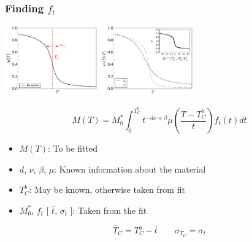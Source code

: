 \documentclass{beamer}
\begin{document}
\begin{frame}
	\frametitle{Finding $f_t$}
		
	\begin{center}
	\includegraphics[width=4cm]{Images/Aggregate} \hspace{3mm}
	\includegraphics[width=4cm]{Images/Ds}
	
	$$
	M(T) = M_0^*\int_0^{T_C^b} t^{-d\nu +\beta} \mu\left(\frac{T-T_C^b}{t}\right) f_t(t) dt
	$$
	
	\begin{itemize}
		\item{$M(T)$: To be fitted}
		\item{$d$, $\nu$, $\beta$, $\mu$: Known information about the material}
		\item{$T_C^b$: May be known, otherwise taken from fit}
		\item{$M_0^*$, $f_t$ [ $\bar{t}$, $\sigma_t$ ]: Taken from the fit}
	\end{itemize}
	
	$$
	\bar{T}_C = T_C^b - \bar{t} \quad \quad \sigma_{T_C} = \sigma_t
	$$
	
	\end{center}
\end{frame}
\end{document}
